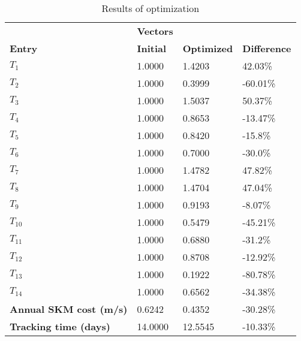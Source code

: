 \begin{table}[H]
\centering
\begin{tabular}{llll}
\textbf{}      & \cellcolor[HTML]{EFEFEF}\textbf{Vectors} & \textbf{} & \textbf{}         \\
\rowcolor[HTML]{EFEFEF} 
\textbf{Entry} & \textbf{Initial} & \textbf{Optimized} & \textbf{Difference} \\
$T_1$ & 1.0000 & 1.4203 & 42.03\% \\ 
$T_2$ & 1.0000 & 0.3999 & -60.01\% \\ 
$T_3$ & 1.0000 & 1.5037 & 50.37\% \\ 
$T_4$ & 1.0000 & 0.8653 & -13.47\% \\ 
$T_5$ & 1.0000 & 0.8420 & -15.8\% \\ 
$T_6$ & 1.0000 & 0.7000 & -30.0\% \\ 
$T_7$ & 1.0000 & 1.4782 & 47.82\% \\ 
$T_8$ & 1.0000 & 1.4704 & 47.04\% \\ 
$T_9$ & 1.0000 & 0.9193 & -8.07\% \\ 
$T_10$ & 1.0000 & 0.5479 & -45.21\% \\ 
$T_11$ & 1.0000 & 0.6880 & -31.2\% \\ 
$T_12$ & 1.0000 & 0.8708 & -12.92\% \\ 
$T_13$ & 1.0000 & 0.1922 & -80.78\% \\ 
$T_14$ & 1.0000 & 0.6562 & -34.38\% \\ 
\rowcolor[HTML]{EFEFEF} 
\textbf{Annual SKM cost (m/s)}  & 0.6242 & 0.4352 & -30.28\% \\ 
\rowcolor[HTML]{EFEFEF} 
\textbf{Tracking time (days)}  & 14.0000 & 12.5545 & -10.33\% \\ 
\end{tabular}
\caption{Results of optimization}
\label{tab:OptimizationAnalysis}
\end{table}